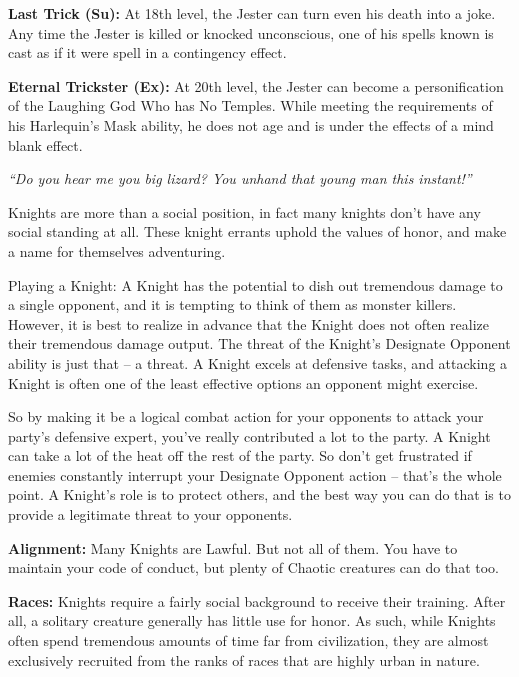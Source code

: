\documentclass[10pt]{article}
\newcommand{\ability}[2]{\smallskip \noindent \textbf{#1} #2}
\newcommand{\classname}[1]{\noindent{\huge \textbf{#1}}}
\newcommand{\quot}[1]{\emph{#1}\medskip}
\newcommand{\desc}[1]{#1 \medskip}
\begin{document}
\ability{Last Trick (Su):}{At 18th level, the Jester can turn even his death into a joke. Any time the Jester is killed or knocked unconscious, one of his spells known is cast as if it were spell in a contingency effect.}

\ability{Eternal Trickster (Ex):}{At 20th level, the Jester can become a personification of the Laughing God Who has No Temples. While meeting the requirements of his Harlequin's Mask ability, he does not age and is under the effects of a mind blank effect.}


\newpage

\classname{Knight}

\quot{``Do you hear me you big lizard? You unhand that young man this instant!''}

\desc{Knights are more than a social position, in fact many knights don't have any social standing at all. These knight errants uphold the values of honor, and make a name for themselves adventuring.}

\desc{Playing a Knight: A Knight has the potential to dish out tremendous damage to a single opponent, and it is tempting to think of them as monster killers. However, it is best to realize in advance that the Knight does not often realize their tremendous damage output. The threat of the Knight's Designate Opponent ability is just that -- a threat. A Knight excels at defensive tasks, and attacking a Knight is often one of the least effective options an opponent might exercise.}

\desc{So by making it be a logical combat action for your opponents to attack your party's defensive expert, you've really contributed a lot to the party. A Knight can take a lot of the heat off the rest of the party. So don't get frustrated if enemies constantly interrupt your Designate Opponent action -- that's the whole point. A Knight's role is to protect others, and the best way you can do that is to provide a legitimate threat to your opponents.}

\ability{Alignment:}{Many Knights are Lawful. But not all of them. You have to maintain your code of conduct, but plenty of Chaotic creatures can do that too.}

\ability{Races:}{Knights require a fairly social background to receive their training. After all, a solitary creature generally has little use for honor. As such, while Knights often spend tremendous amounts of time far from civilization, they are almost exclusively recruited from the ranks of races that are highly urban in nature.}
\end{document}
